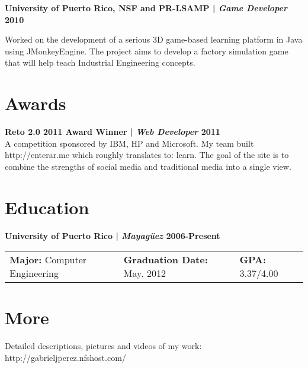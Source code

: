 \documentclass[margin,line]{res}
\begin{document}
\begin{resume}
{\bf University of Puerto Rico, NSF and PR-LSAMP | {\em Game Developer} \hfill {\bf 2010 \\} }
\vspace{-.01cm}

Worked on the development of a serious 3D game-based learning platform in Java using JMonkeyEngine. The project aims to develop a factory simulation game that will help teach Industrial Engineering concepts.

\section{\sc Awards}

{\bf Reto 2.0 2011 Award Winner | {\em Web Developer} \hfill {\bf 2011 \\} }
\vspace{-.01cm}
A competition sponsored by IBM, HP and Microsoft. My team built http://enterar.me which roughly translates to: learn. The goal of the site is to combine the strengths of social media and traditional media into a single view. 





\section{\sc Education}

{\bf University of Puerto Rico | {\em Mayag\"uez } \hfill {\bf 2006-Present } }
\vspace{-.01cm}
\begin{tabular}{@{}p{2in}p{2in}p{2in}}
 {\bf Major:} Computer Engineering           & {\bf Graduation Date:} May. 2012  & {\bf GPA:} 3.37/4.00  \\            
\end{tabular}


\section{\sc More}
Detailed descriptions, pictures and videos of my work: http://gabrieljperez.nfshost.com/    \\

\end{resume}
\end{document}
